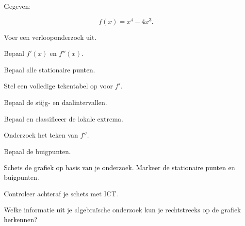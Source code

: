 \documentclass{ximera}
\begin{document}





\begin{oefening}{\oefU\ESS}

Gegeven:

\[
f(x)=x^4-4x^3.
\]

Voer een verlooponderzoek uit.

\begin{question}
Bepaal $f'(x)$ en $f''(x)$.
\end{question}

\begin{question}
Bepaal alle stationaire punten.
\end{question}

\begin{question}
Stel een volledige tekentabel op voor $f'$.
\end{question}

\begin{question}
Bepaal de stijg- en daalintervallen.
\end{question}

\begin{question}
Bepaal en classificeer de lokale extrema.
\end{question}

\begin{question}
Onderzoek het teken van $f''$.
\end{question}

\begin{question}
Bepaal de buigpunten.
\end{question}

\begin{question}
Schets de grafiek op basis van je onderzoek.
Markeer de stationaire punten en buigpunten.
\end{question}

\begin{question}
Controleer achteraf je schets met ICT.

Welke informatie uit je algebraïsche onderzoek kun je rechtstreeks
op de grafiek herkennen?
\end{question}


\end{oefening}
\end{document}
